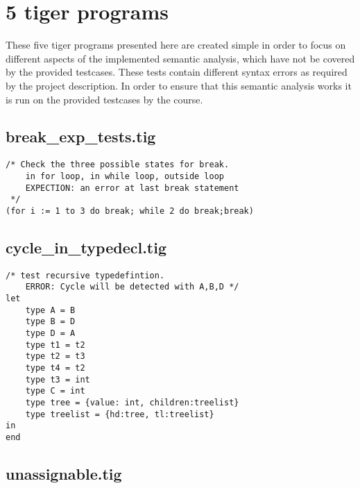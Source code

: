 \documentclass{article}
\begin{document}
\section{5 tiger programs}

These five tiger programs presented here are created simple in order to focus on different aspects of the implemented semantic analysis, which have not be covered by the provided testcases. These tests contain different syntax errors as required by the project description. In order to ensure that this semantic analysis works it is run on the provided testcases by the course. 



\subsection{break\_exp\_tests.tig}

\begin{lstlisting}[frame=single]
/* Check the three possible states for break.
	in for loop, in while loop, outside loop
	EXPECTION: an error at last break statement
 */
(for i := 1 to 3 do break; while 2 do break;break)
\end{lstlisting}

\subsection{cycle\_in\_typedecl.tig}

\begin{lstlisting}[frame=single]
/* test recursive typedefintion.
	ERROR: Cycle will be detected with A,B,D */
let
	type A = B
	type B = D
	type D = A
	type t1 = t2
	type t2 = t3
	type t4 = t2
	type t3 = int
	type C = int
	type tree = {value: int, children:treelist}
	type treelist = {hd:tree, tl:treelist}
in 
end
\end{lstlisting}

\subsection{unassignable.tig}
\end{document}
